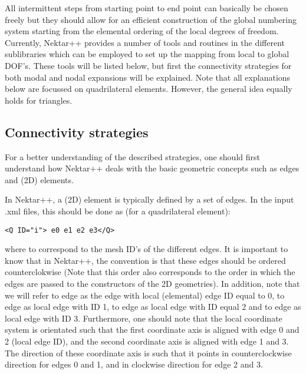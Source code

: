 All intermittent steps from starting point to end point can basically be chosen
freely but they should allow for an efficient construction of the global
numbering system starting from the elemental ordering of the local degrees of
freedom. Currently, Nektar++ provides a number of tools and routines in the
different sublibraries which can be employed to set up the mapping from local to
global DOF's. These tools will be listed below, but first the connectivity
strategies for both modal and nodal expansions will be explained. Note that all
explanations below are focussed on quadrilateral elements. However, the general
idea equally holds for triangles.

\subsection{Connectivity strategies}

For a better understanding of the described strategies, one should first
understand how Nektar++ deals with the basic geometric concepts such as edges
and (2D) elements.

In Nektar++, a (2D) element is typically defined by a set of edges. In the input
.xml files, this should be done as (for a quadrilateral element):
\begin{lstlisting}[style=XMLStyle]
 <Q ID="i"> e0 e1 e2 e3</Q>
\end{lstlisting}
where  to  correspond to the mesh ID's of the different
edges.
It is important to know that in Nektar++, the convention is that these edges
should be ordered counterclokwise (Note that this order also corresponds to the
order in which the edges are passed to the constructors of the 2D geometries).
In addition, note that we will refer to edge  as the edge with local
(elemental) edge ID equal to 0, to edge  as local edge with ID 1, to
edge  as local edge with ID equal 2 and to edge  as local
edge with ID 3.
Furthermore, one should note that the local coordinate system is orientated such
that the first coordinate axis is aligned with edge 0 and 2 (local edge ID), and
the second coordinate axis is aligned with edge 1 and 3. The direction of these
coordinate axis is such that it points in counterclockwise direction for edges 0
and 1, and in clockwise direction for edge 2 and 3.

